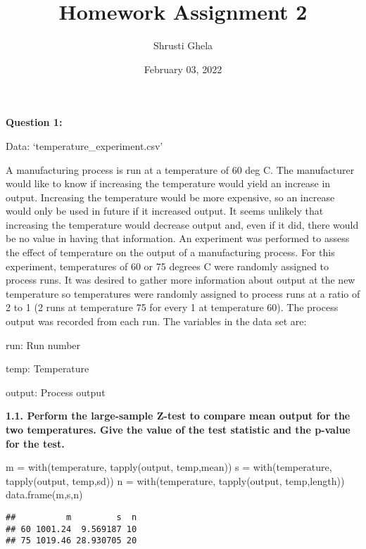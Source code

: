 \documentclass[
]{article}
\title{Homework Assignment 2}
\author{Shrusti Ghela}
\date{February 03, 2022}
\newenvironment{Shaded}{\begin{snugshade}}{\end{snugshade}}
\newcommand{\FunctionTok}[1]{\textcolor[rgb]{0.00,0.00,0.00}{#1}}
\newcommand{\NormalTok}[1]{#1}
\newcommand{\OtherTok}[1]{\textcolor[rgb]{0.56,0.35,0.01}{#1}}
\begin{document}
\maketitle

\textbf{Question 1:}

Data: `temperature\_experiment.csv'

A manufacturing process is run at a temperature of 60 deg C. The
manufacturer would like to know if increasing the temperature would
yield an increase in output. Increasing the temperature would be more
expensive, so an increase would only be used in future if it increased
output. It seems unlikely that increasing the temperature would decrease
output and, even if it did, there would be no value in having that
information. An experiment was performed to assess the effect of
temperature on the output of a manufacturing process. For this
experiment, temperatures of 60 or 75 degrees C were randomly assigned to
process runs. It was desired to gather more information about output at
the new temperature so temperatures were randomly assigned to process
runs at a ratio of 2 to 1 (2 runs at temperature 75 for every 1 at
temperature 60). The process output was recorded from each run. The
variables in the data set are:

run: Run number

temp: Temperature

output: Process output

\textbf{1.1. Perform the large-sample Z-test to compare mean output for
the two temperatures. Give the value of the test statistic and the
p-value for the test.}

\begin{Shaded}
\begin{Highlighting}[]
\NormalTok{m }\OtherTok{=} \FunctionTok{with}\NormalTok{(temperature, }\FunctionTok{tapply}\NormalTok{(output, temp,mean))}
\NormalTok{s }\OtherTok{=} \FunctionTok{with}\NormalTok{(temperature, }\FunctionTok{tapply}\NormalTok{(output, temp,sd))}
\NormalTok{n }\OtherTok{=} \FunctionTok{with}\NormalTok{(temperature, }\FunctionTok{tapply}\NormalTok{(output, temp,length))}
\FunctionTok{data.frame}\NormalTok{(m,s,n)}
\end{Highlighting}
\end{Shaded}

\begin{verbatim}
##          m         s  n
## 60 1001.24  9.569187 10
## 75 1019.46 28.930705 20
\end{verbatim}
\end{document}
